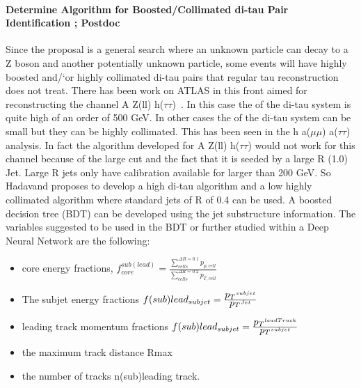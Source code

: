 
\paragraph{Determine Algorithm for Boosted/Collimated di-tau Pair Identification ; Postdoc} %
Since the proposal is a general search where an unknown particle can decay to a Z boson and another potentially unknown particle, some events will have highly boosted and/`or highly collimated di-tau pairs that regular
tau reconstruction does not treat.  There has been work on ATLAS in this front aimed for reconstructing the channel A \too Z(ll) h($\tau\tau$)~\cite{di-tau-thesis}.  In this case the \pt of the di-tau system is quite high of an order of 500 GeV.
In other cases the \pt of the di-tau system can be small but they can be highly collimated.  This has been seen in the h \too a($\mu \mu$) a($\tau \tau$) analysis.  In fact the algorithm developed for A \too Z(ll) h($\tau\tau$) would not 
work for this channel because of the large \pt cut and the fact that it is seeded by a large R (1.0) Jet.  Large R jets only have calibration available for \pt larger than 200 GeV.  So Hadavand proposes to develop a high \pt di-tau
algorithm and a low \pt highly collimated algorithm where standard jets of R of 0.4 can be used. A boosted decision tree (BDT) can be developed using the jet substructure information.  
The variables suggested to be used in the BDT or further studied within a Deep Neural Network are the following:
\begin{itemize}
\item{core energy fractions, $f_{core}^{sub(lead)}=\frac{\sum_{cells}^{\Delta R=0.1} p_{p,cell}}{\sum_{cells}^{\Delta R=0.2}p_{T,cell}} $}
\item{The subjet energy fractions $f(sub)lead_{subjet}=\frac{\mbox{$p_T$} ^{subjet}}{\mbox{$p_T$} ^{Jet}}$}
\item{leading track momentum fractions $f(sub)lead_{subjet}=\frac{\mbox{$p_T$} ^{leadTrack}}{\mbox{$p_T$} ^{subjet}}$}
\item{the maximum track distance Rmax}
\item{the number of tracks n(sub)leading track.}
\end{itemize}

